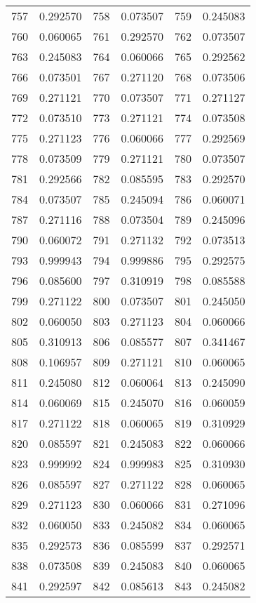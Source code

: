 \documentclass[12pt]{article}
\begin{document}
\begin{longtable}{@{}cc|cc|cc@{}}
757 & 0.292570 & 758 & 0.073507 & 759 & 0.245083 \\
760 & 0.060065 & 761 & 0.292570 & 762 & 0.073507 \\
763 & 0.245083 & 764 & 0.060066 & 765 & 0.292562 \\
766 & 0.073501 & 767 & 0.271120 & 768 & 0.073506 \\
769 & 0.271121 & 770 & 0.073507 & 771 & 0.271127 \\
772 & 0.073510 & 773 & 0.271121 & 774 & 0.073508 \\
775 & 0.271123 & 776 & 0.060066 & 777 & 0.292569 \\
778 & 0.073509 & 779 & 0.271121 & 780 & 0.073507 \\
781 & 0.292566 & 782 & 0.085595 & 783 & 0.292570 \\
784 & 0.073507 & 785 & 0.245094 & 786 & 0.060071 \\
787 & 0.271116 & 788 & 0.073504 & 789 & 0.245096 \\
790 & 0.060072 & 791 & 0.271132 & 792 & 0.073513 \\
793 & 0.999943 & 794 & 0.999886 & 795 & 0.292575 \\
796 & 0.085600 & 797 & 0.310919 & 798 & 0.085588 \\
799 & 0.271122 & 800 & 0.073507 & 801 & 0.245050 \\
802 & 0.060050 & 803 & 0.271123 & 804 & 0.060066 \\
805 & 0.310913 & 806 & 0.085577 & 807 & 0.341467 \\
808 & 0.106957 & 809 & 0.271121 & 810 & 0.060065 \\
811 & 0.245080 & 812 & 0.060064 & 813 & 0.245090 \\
814 & 0.060069 & 815 & 0.245070 & 816 & 0.060059 \\
817 & 0.271122 & 818 & 0.060065 & 819 & 0.310929 \\
820 & 0.085597 & 821 & 0.245083 & 822 & 0.060066 \\
823 & 0.999992 & 824 & 0.999983 & 825 & 0.310930 \\
826 & 0.085597 & 827 & 0.271122 & 828 & 0.060065 \\
829 & 0.271123 & 830 & 0.060066 & 831 & 0.271096 \\
832 & 0.060050 & 833 & 0.245082 & 834 & 0.060065 \\
835 & 0.292573 & 836 & 0.085599 & 837 & 0.292571 \\
838 & 0.073508 & 839 & 0.245083 & 840 & 0.060065 \\
841 & 0.292597 & 842 & 0.085613 & 843 & 0.245082 \\

\end{longtable}
\end{document}

